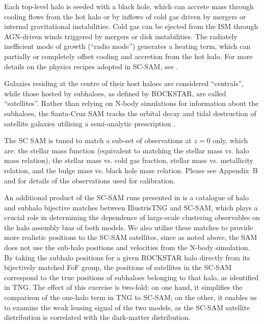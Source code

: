 \documentclass[fleqn,usenatbib]{mnras}
\begin{document}
Each top-level halo is seeded with a black hole, which can accrete mass through cooling flows from the hot halo or by inflows of cold gas driven by mergers or internal gravitational instabilities. Cold gas can be ejected from the ISM through AGN-driven winds triggered by mergers or disk instabilities.  The radiately inefficient mode of growth (``radio mode'') generates a heating term, which can partially or completely offset cooling and accretion from the hot halo.
For more details on the physics recipes adopted in SC-SAM, see \citet{2008MNRAS.391..481S}.

Galaxies residing at the centre of their host haloes are considered ``centrals'', while those hosted by subhaloes, as defined by \textsc{ROCKSTAR}, are called ``satellites''. Rather than relying on N-body simulations for information about the subhaloes, the Santa-Cruz SAM tracks the orbital decay and tidal destruction of satellite galaxies utilising a semi-analytic prescription \citep[see][for details]{2008MNRAS.391..481S}.

The SC SAM is tuned to match a sub-set of observations at $z=0$ only, which are: the stellar mass function (equivalent to matching the stellar mass vs. halo mass relation), the stellar mass vs. cold gas fraction, stellar mass vs. metallicity relation, and the bulge mass vs. black hole mass relation. Please see \citet{Yung:2019a} Appendix~B and \citet{Austen+2021} for details of the observations used for calibration. 

An additional product of the SC-SAM runs presented in \citet{Austen+2021} is a catalogue of halo and subhalo bijective matches between IllustrisTNG and SC-SAM, which plays a crucial role in determining the dependence of large-scale clustering observables on the halo assembly bias of both models. We also utilise these matches to provide more realistic positions to the SC-SAM satellites, since as noted above, the SAM does not use the sub-halo positions and velocities from the N-body simulation. By taking the subhalo positions for a given \textsc{ROCKSTAR} halo directly from its bijectively matched FoF group, the positions of satellites in the SC-SAM correspond to the true positions of subhaloes belonging to that halo, as identified in TNG. The effect of this exercise is two-fold: on one hand, it simplifies the comparison of the one-halo term in TNG to SC-SAM; on the other, it enables us to examine the weak lensing signal of the two models, as the SC-SAM satellite distribution is correlated with the dark-matter distribution.
\end{document}
